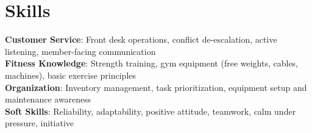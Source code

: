 \documentclass[letterpaper,11pt]{article}
\begin{document}
\section{Skills}
 \begin{itemize}[leftmargin=0.15in, label={}]
    \small{\item{
     \textbf{Customer Service}{: Front desk operations, conflict de-escalation, active listening, member-facing communication} \\
     \textbf{Fitness Knowledge}{: Strength training, gym equipment (free weights, cables, machines), basic exercise principles} \\
     \textbf{Organization}{: Inventory management, task prioritization, equipment setup and maintenance awareness} \\
     \textbf{Soft Skills}{: Reliability, adaptability, positive attitude, teamwork, calm under pressure, initiative}
    }}
 \end{itemize}

\end{document}
